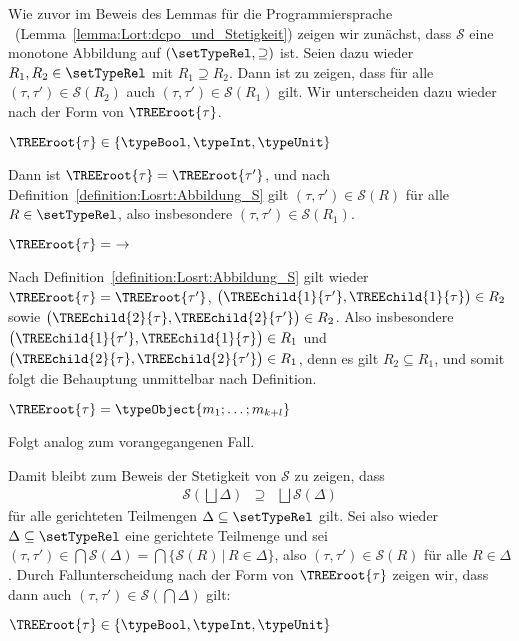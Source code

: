 \begin{beweis}
  Wie zuvor im Beweis des Lemmas f\"ur die Programmiersprache \Lort\ (Lemma~\ref{lemma:Lort:dcpo_und_Stetigkeit}) zeigen wir
  zun\"achst, dass $\mathcal{S}$ eine monotone Abbildung auf $(\setTypeRel,\supseteq)$ ist. Seien dazu wieder $R_1,R_2\in\setTypeRel$
  mit $R_1 \supseteq R_2$. Dann ist zu zeigen, dass f\"ur alle
  $(\tau,\tau')\in\mathcal{S}(R_2)$ auch $(\tau,\tau')\in\mathcal{S}(R_1)$ gilt. Wir unterscheiden dazu wieder
  nach der Form von $\TREEroot{\tau}$.
  \PROOFCASEbeg
    \item $\TREEroot{\tau} \in \{\typeBool,\typeInt,\typeUnit\}$

          Dann ist $\TREEroot{\tau} = \TREEroot{\tau'}$, und nach Definition~\ref{definition:Losrt:Abbildung_S} gilt
          $(\tau,\tau')\in\mathcal{S}(R)$ f\"ur alle $R\in\setTypeRel$, also insbesondere $(\tau,\tau')\in\mathcal{S}(R_1)$.

    \item $\TREEroot{\tau} =\ \to$

          Nach Definition~\ref{definition:Losrt:Abbildung_S} gilt wieder $\TREEroot{\tau} = \TREEroot{\tau'}$,
          $\bigl(\TREEchild{1}{\tau'},\TREEchild{1}{\tau}\bigr)\in{R_2}$ sowie
          $\bigl(\TREEchild{2}{\tau},\TREEchild{2}{\tau'}\bigr)\in{R_2}$. Also insbesondere
          $\bigl(\TREEchild{1}{\tau'},\TREEchild{1}{\tau}\bigr)\in{R_1}$ und
          $\bigl(\TREEchild{2}{\tau},\TREEchild{2}{\tau'}\bigr)\in{R_1}$, denn es gilt $R_2 \subseteq R_1$, und
          somit folgt die Behauptung unmittelbar nach Definition.

    \item $\TREEroot{\tau} = \typeObject{m_1;\ldots;m_{k+l}}$

          Folgt analog zum vorangegangenen Fall.
  \PROOFCASEend

  Damit bleibt zum Beweis der Stetigkeit von $\mathcal{S}$ zu zeigen, dass
  \[\begin{array}{rcl}
    \mathcal{S}(\bigsqcup \Delta) & \supseteq & \bigsqcup \mathcal{S}(\Delta)
  \end{array}\]
  f\"ur alle gerichteten Teilmengen $\Delta\subseteq\setTypeRel$ gilt. Sei also
  wieder $\Delta\subseteq\setTypeRel$ eine gerichtete Teilmenge und sei
  $(\tau,\tau')\in\bigcap \mathcal{S}(\Delta) = \bigcap \{\mathcal{S}(R)\,|\,R\in\Delta\}$,
  also $(\tau,\tau')\in\mathcal{S}(R)$ f\"ur alle $R\in\Delta$. Durch Fallunterscheidung nach
  der Form von $\TREEroot{\tau}$ zeigen wir, dass dann auch $(\tau,\tau')\in\mathcal{S}(\bigcap \Delta)$ gilt:
  \PROOFCASEbeg
    \item $\TREEroot{\tau}\in\{\typeBool,\typeInt,\typeUnit\}$


\end{beweis}
